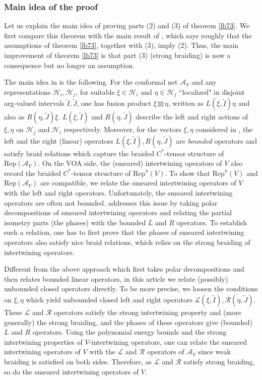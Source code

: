 \documentclass[12pt,a4paper]{article}
\theoremstyle{definition}
\theoremstyle{plain}
\newcommand{\mc}{\mathcal}
\newcommand{\wtd}{\widetilde}
\newcommand{\Rep}{\mathrm{Rep}}
\newcommand{\Repu}{\mathrm{Rep}^{\mathrm u}}
\newcommand{\scr}{\mathscr}
\numberwithin{equation}{subsection}
\begin{document}
\subsubsection*{Main idea of the proof}

Let us explain the main idea of proving parts (2) and (3) of theorem \ref{lb73}. We first compare this theorem with the main result of \cite{Gui21a}, which says roughly that the assumptions of theorem \ref{lb73}, together with (3), imply (2). Thus, the main improvement of theorem \ref{lb73} is that part (3) (strong braiding) is now a consequence but no  longer an assumption. 

The main idea in \cite{Gui21a} is the following. For the conformal net $\mc A_V$ and any representations $\mc H_i,\mc H_j$, for suitable $\xi\in\mc H_i$ and $\eta\in\mc H_j$ ``localized" in disjoint arg-valued intervals $\wtd I,\wtd J$, one has fusion product $\xi\boxtimes\eta$, written as $L(\xi,\wtd I)\eta$ and also as $R(\eta,\wtd J)\xi$. $L(\xi,\wtd I)$ and $R(\eta,\wtd J)$ describe the left and right actions of $\xi,\eta$ on $\mc H_j$ and $\mc H_i$ respectively. Moreover, for the vectors $\xi,\eta$ considered in \cite{Gui21a}, the left and the right (linear) operators $L(\xi,\wtd I),R(\eta,\wtd J)$ are \emph{bounded} operators and satisfy braid relations which capture the braided $C^*$-tensor structure of $\Rep(\mc A_V)$. On the VOA side, the (smeared) intertwining operators of $V$ also record the braided $C^*$-tensor structure of $\Repu(V)$. To show that $\Repu(V)$ and $\Rep(\mc A_V)$ are compatible, we relate the smeared intertwining operators of $V$ with the left and right operators. Unfortunately, the smeared intertwining operators are often not bounded. \cite{Gui21a} addresses this issue by taking polar decompositions of smeared intertwining operators and relating the partial isometry parts (the phases) with the bounded $L$ and $R$ operators. To establish such a relation, one has to first prove that the phases of smeared intertwining operators also satisfy nice braid relations, which relies on  the strong braiding of intertwining operators.




Different from the above approach which first takes polar decompositions and then relates bounded linear operators,  in this article we relate (possibly) unbounded closed operators directly. To be more precise, we loosen the conditions on $\xi,\eta$ which yield unbounded closed left and right operators $\scr L(\xi,\wtd I),\scr R(\eta,\wtd J)$. These $\scr L$ and $\scr R$ operators satisfy the strong intertwining property and (more generally) the strong braiding, and the phases of these operators give (bounded) $L$ and $R$ operators. Using the polynomial energy bounds and the strong intertwining properties of $V$-intertwining operators, one can relate the smeared intertwining operators of $V$ with the $\scr L$ and $\scr R$ operators of $\mc A_V$ since  weak braiding is satisfied on both sides. Therefore, as $\scr L$ and $\scr R$ satisfy strong braiding, so do the smeared intertwining operators  of $V$.
\end{document}

